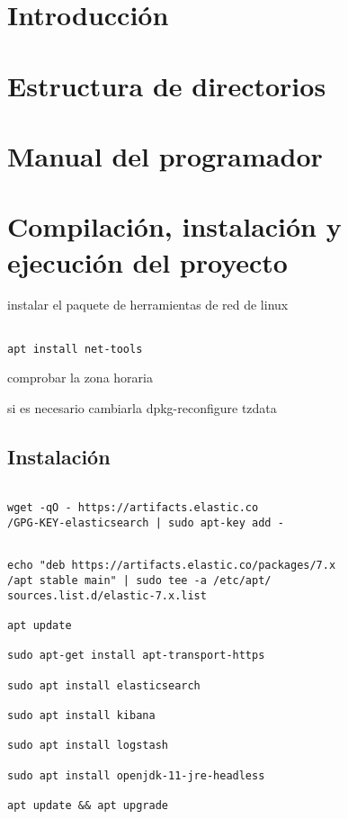 

\section{Introducción}

\section{Estructura de directorios}

\section{Manual del programador}

\section{Compilación, instalación y ejecución del proyecto}

instalar el paquete de herramientas de red de linux
\begin{lstlisting}[frame=single] 

apt install net-tools

\end{lstlisting}

comprobar la zona horaria

si es necesario cambiarla
dpkg-reconfigure tzdata

\subsection{Instalación}


\begin{lstlisting}[frame=single] 

wget -qO - https://artifacts.elastic.co
/GPG-KEY-elasticsearch | sudo apt-key add -

\end{lstlisting}

\begin{lstlisting}[frame=single] 

echo "deb https://artifacts.elastic.co/packages/7.x
/apt stable main" | sudo tee -a /etc/apt/
sources.list.d/elastic-7.x.list

apt update

sudo apt-get install apt-transport-https

sudo apt install elasticsearch

sudo apt install kibana

sudo apt install logstash

sudo apt install openjdk-11-jre-headless

apt update && apt upgrade
 
 
 \end{lstlisting}
 
